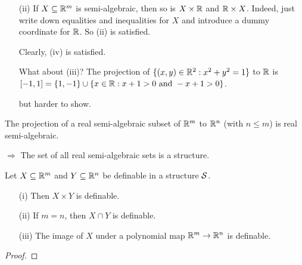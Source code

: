 \documentclass{beamer}
\begin{document}
\begin{frame}
  \begin{example}[Continued]
    \begin{enumerate}
    \item [(ii)]
      If $X\subseteq {\mathbb{R}}^m$ is semi-algebraic, then
      so is $X\times {\mathbb{R}}$ and ${\mathbb{R}}\times X$. Indeed, just write down equalities and
      inequalities for $X$ and introduce a dummy  coordinate for
      ${\mathbb{R}}$.
      So
      (ii) is satisfied.

      Clearly, (iv) is satisfied.
      
      What about (iii)? The projection of $\{(x,y) \in{\mathbb{R}}^2 :
      x^2+y^2=1\}$ to ${\mathbb{R}}$ is $[-1,1] = \{1,-1\}\cup
      \{x\in {\mathbb{R}} : x+1>0\text{ and }-x+1>0\}$.

      but harder to show.
    \end{enumerate}
  \end{example}
  
  \begin{theorem}
    The projection of a real semi-algebraic subset of ${\mathbb{R}}^m$ to
    ${\mathbb{R}}^n$ (with $n\le m$) is real semi-algebraic. 
  \end{theorem}

  $\Longrightarrow$ The set of all real semi-algebraic sets is a structure.
\end{frame}

\begin{frame}
  \begin{lemma}
    Let $X\subseteq{\mathbb{R}}^m$ and $Y\subseteq{\mathbb{R}}^n$ be definable in a structure  ${\mathcal S}$.
    \begin{enumerate}   
    \item [(i)] Then $X\times Y$ is definable.
    \item[(ii)] If $m=n$, then $X\cap Y$ is definable.
    \item[(iii)] The image of $X$ under a polynomial map
      ${\mathbb{R}}^m\rightarrow {\mathbb{R}}^n$ is definable.
    \end{enumerate}
  \end{lemma}
  \begin{proof}
    \vspace{4cm}
  \end{proof}
\end{frame}
\end{document}
